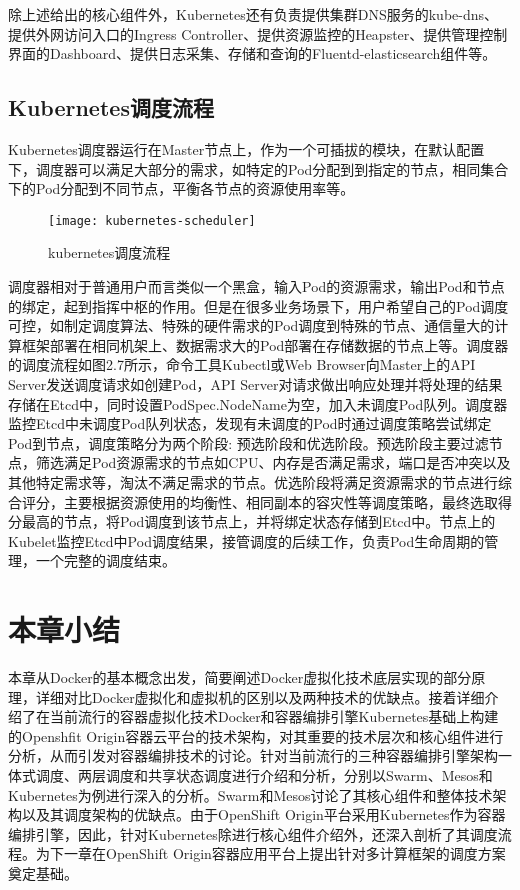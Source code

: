 除上述给出的核心组件外，Kubernetes还有负责提供集群DNS服务的kube-dns、提供外网访问入口的Ingress Controller、提供资源监控的Heapster、提供管理控制界面的Dashboard、提供日志采集、存储和查询的Fluentd-elasticsearch组件等。

\subsection{Kubernetes调度流程}
Kubernetes调度器运行在Master节点上，作为一个可插拔的模块，在默认配置下，调度器可以满足大部分的需求，如特定的Pod分配到到指定的节点，相同集合下的Pod分配到不同节点，平衡各节点的资源使用率等。
\begin{figure}[H] %
	\centering
	\texttt{[image: kubernetes-scheduler]}
	\caption{kubernetes调度流程}
\end{figure}
调度器相对于普通用户而言类似一个黑盒，输入Pod的资源需求，输出Pod和节点的绑定，起到指挥中枢的作用。但是在很多业务场景下，用户希望自己的Pod调度可控，如制定调度算法、特殊的硬件需求的Pod调度到特殊的节点、通信量大的计算框架部署在相同机架上、数据需求大的Pod部署在存储数据的节点上等。调度器的调度流程如图2.7所示，命令工具Kubectl或Web Browser向Master上的API Server发送调度请求如创建Pod，API Server对请求做出响应处理并将处理的结果存储在Etcd中，同时设置PodSpec.NodeName为空，加入未调度Pod队列。调度器监控Etcd中未调度Pod队列状态，发现有未调度的Pod时通过调度策略尝试绑定Pod到节点，调度策略分为两个阶段: 预选阶段和优选阶段。预选阶段主要过滤节点，筛选满足Pod资源需求的节点如CPU、内存是否满足需求，端口是否冲突以及其他特定需求等，淘汰不满足需求的节点。优选阶段将满足资源需求的节点进行综合评分，主要根据资源使用的均衡性、相同副本的容灾性等调度策略，最终选取得分最高的节点，将Pod调度到该节点上，并将绑定状态存储到Etcd中。节点上的Kubelet监控Etcd中Pod调度结果，接管调度的后续工作，负责Pod生命周期的管理，一个完整的调度结束。

\section{本章小结}
本章从Docker的基本概念出发，简要阐述Docker虚拟化技术底层实现的部分原理，详细对比Docker虚拟化和虚拟机的区别以及两种技术的优缺点。接着详细介绍了在当前流行的容器虚拟化技术Docker和容器编排引擎Kubernetes基础上构建的Openshfit Origin容器云平台的技术架构，对其重要的技术层次和核心组件进行分析，从而引发对容器编排技术的讨论。针对当前流行的三种容器编排引擎架构一体式调度、两层调度和共享状态调度进行介绍和分析，分别以Swarm、Mesos和Kubernetes为例进行深入的分析。Swarm和Mesos讨论了其核心组件和整体技术架构以及其调度架构的优缺点。由于OpenShift Origin平台采用Kubernetes作为容器编排引擎，因此，针对Kubernetes除进行核心组件介绍外，还深入剖析了其调度流程。为下一章在OpenShift Origin容器应用平台上提出针对多计算框架的调度方案奠定基础。




